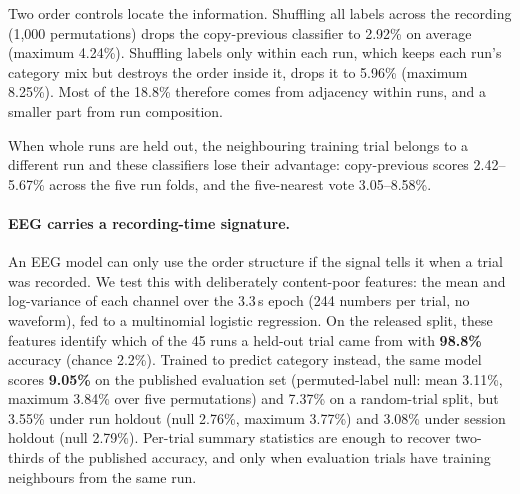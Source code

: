 Two order controls locate the information. Shuffling all labels across the recording (1{,}000
permutations) drops the copy-previous classifier to 2.92\% on average (maximum 4.24\%). Shuffling
labels only within each run, which keeps each run's category mix but destroys the order inside it,
drops it to 5.96\% (maximum 8.25\%). Most of the 18.8\% therefore comes from adjacency within runs,
and a smaller part from run composition.

When whole runs are held out, the neighbouring training trial belongs to a different run and these
classifiers lose their advantage: copy-previous scores 2.42--5.67\% across the five run folds, and
the five-nearest vote 3.05--8.58\%.



\paragraph{EEG carries a recording-time signature.}
An EEG model can only use the order structure if the signal tells it when a trial was recorded.
We test this with deliberately content-poor features: the mean and log-variance of each channel over
the 3.3\,s epoch (244 numbers per trial, no waveform), fed to a multinomial logistic regression.
On the released split, these features identify which of the 45 runs a held-out trial came from with
\textbf{98.8\%} accuracy (chance 2.2\%). Trained to predict category instead, the same model scores
\textbf{9.05\%} on the published evaluation set (permuted-label null: mean 3.11\%, maximum 3.84\% over
five permutations) and 7.37\% on a random-trial split, but 3.55\% under run holdout (null 2.76\%,
maximum 3.77\%) and 3.08\% under session holdout (null 2.79\%). Per-trial summary statistics are
enough to recover two-thirds of the published accuracy, and only when evaluation trials have
training neighbours from the same run.
